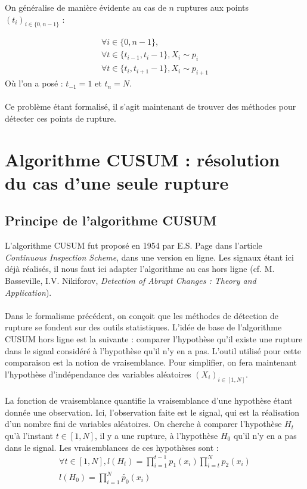 \documentclass[french,12pt,notitlepage]{report}
\begin{document}
	On généralise de manière évidente au cas de $n$ ruptures aux points $(t_i)_{i \in \{0, n-1\}}$ :
	
	\begin{equation}
	\begin{array}{lll}
		\forall i \in \{0, n-1\}, \\
		\forall t \in \{t_{i-1}, t_i-1\}, X_i \sim p_i \\
		\forall t \in \{t_i, t_{i+1}-1\}, X_i \sim p_{i+1}
	\end{array}
	\label{multi_rupt}
	\end{equation}
	Où l'on a posé : $t_{-1} = 1$ et $t_n = N$.
	\\ \\
	Ce problème étant formalisé, il s'agit maintenant de trouver des méthodes pour détecter ces points de rupture.
	
	\chapter{Algorithme CUSUM : résolution du cas d'une seule rupture}
	
	
	\section{Principe de l'algorithme CUSUM}
	L'algorithme CUSUM fut proposé en 1954 par E.S. Page dans l'article \textit{Continuous Inspection Scheme}, dans une version en ligne. Les signaux étant ici déjà réalisés, il nous faut ici adapter l'algorithme au cas hors ligne (cf. M. Basseville, I.V. Nikiforov, \textit{Detection of Abrupt Changes : Theory and Application}).
	\\ \\
	Dans le formalisme précédent, on conçoit que les méthodes de détection de rupture se fondent sur des outils statistiques. L'idée de base de l'algorithme CUSUM hors ligne est la suivante : comparer l'hypothèse qu'il existe une rupture dans le signal considéré à l'hypothèse qu'il n'y en a pas. L'outil utilisé pour cette comparaison est la notion de vraisemblance. Pour simplifier, on fera maintenant l'hypothèse d'indépendance des variables aléatoires $(X_i)_{i \in [1,N]}$.
	\\ \\
	La fonction de vraisemblance quantifie la vraisemblance d'une hypothèse étant donnée une observation. Ici, l'observation faite est le signal, qui est la réalisation d'un nombre fini de variables aléatoires. On cherche à comparer l'hypothèse $H_t$ qu'à l'instant $t \in [1, N]$, il y a une rupture, à l'hypothèse $H_0$ qu'il n'y en a pas dans le signal. Les vraisemblances de ces hypothèses sont :
	\begin{equation}
	\begin{array}{ll}
		\forall t \in [1, N],l(H_t) = \prod_{i = 1}^{t-1} p_1(x_i) \prod_{i = t}^{N} p_2(x_i) \\
		l(H_0) = \prod_{i = 1}^N \tilde{p_0}(x_i) \\
	\end{array}	
	\end{equation}
	
\end{document}
